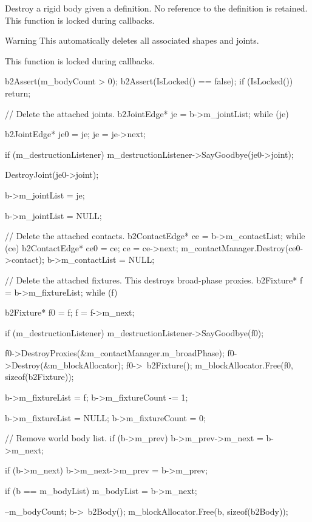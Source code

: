 Destroy a rigid body given a definition. No reference to the definition is retained. This function is locked during callbacks. \begin{DoxyWarning}{Warning}
This automatically deletes all associated shapes and joints. 

This function is locked during callbacks. 
\end{DoxyWarning}

\begin{DoxyCode}
{
        b2Assert(m_bodyCount > 0);
        b2Assert(IsLocked() == false);
        if (IsLocked())
        {
                return;
        }

        // Delete the attached joints.
        b2JointEdge* je = b->m_jointList;
        while (je)
        {
                b2JointEdge* je0 = je;
                je = je->next;

                if (m_destructionListener)
                {
                        m_destructionListener->SayGoodbye(je0->joint);
                }

                DestroyJoint(je0->joint);

                b->m_jointList = je;
        }
        b->m_jointList = NULL;

        // Delete the attached contacts.
        b2ContactEdge* ce = b->m_contactList;
        while (ce)
        {
                b2ContactEdge* ce0 = ce;
                ce = ce->next;
                m_contactManager.Destroy(ce0->contact);
        }
        b->m_contactList = NULL;

        // Delete the attached fixtures. This destroys broad-phase proxies.
        b2Fixture* f = b->m_fixtureList;
        while (f)
        {
                b2Fixture* f0 = f;
                f = f->m_next;

                if (m_destructionListener)
                {
                        m_destructionListener->SayGoodbye(f0);
                }

                f0->DestroyProxies(&m_contactManager.m_broadPhase);
                f0->Destroy(&m_blockAllocator);
                f0->~b2Fixture();
                m_blockAllocator.Free(f0, sizeof(b2Fixture));

                b->m_fixtureList = f;
                b->m_fixtureCount -= 1;
        }
        b->m_fixtureList = NULL;
        b->m_fixtureCount = 0;

        // Remove world body list.
        if (b->m_prev)
        {
                b->m_prev->m_next = b->m_next;
        }

        if (b->m_next)
        {
                b->m_next->m_prev = b->m_prev;
        }

        if (b == m_bodyList)
        {
                m_bodyList = b->m_next;
        }

        --m_bodyCount;
        b->~b2Body();
        m_blockAllocator.Free(b, sizeof(b2Body));
}
\end{DoxyCode}
